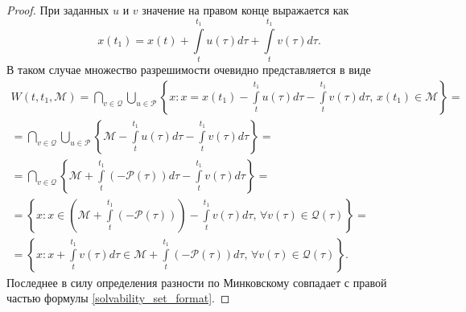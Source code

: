 \begin{proof}
    При заданных \( u \) и \( v \) значение на правом конце выражается как 
    \[
        x(t_1) = x(t) + \int\limits_t^{t_1}u(\tau)d\tau + \int\limits_t^{t_1}
        v(\tau)d\tau.
    \]
    В таком случае множество разрешимости очевидно представляется в виде
    \begin{multline*}
        W(t, t_1, \mathcal{M}) = \bigcap\limits_{v \in \mathcal{Q}} 
         \bigcup\limits_{u \in \mathcal{P}} \left\{ x : x = x(t_1)
         -\int\limits_t^{t_1}u(\tau) d\tau - \int\limits_t^{t_1} v(\tau)
         d\tau, \, x(t_1) \in \mathcal{M} \right\} = \\
        = \bigcap\limits_{v \in \mathcal{Q}} \bigcup\limits_{u \in 
         \mathcal{P}} \left\{ \mathcal{M} - \int\limits_t^{t_1} u(\tau) d\tau
         - \int\limits_t^{t_1} v(\tau) d\tau \right\} = \\
        = \bigcap\limits_{v \in \mathcal{Q}} \left\{ \mathcal{M} +
         \int\limits_t^{t_1}(-\mathcal{P}(\tau)) d\tau - \int\limits_t^{t_1}
         v(\tau) d\tau \right\} = \\
        = \left\{ x : x \in \left( \mathcal{M} + \int\limits_t^{t_1}(- \mathcal{P}
         (\tau)) \right)  - \int\limits_t^{t_1} v(\tau) d\tau, \, \forall v(\tau)
         \in \mathcal{Q}(\tau) \right\} = \\
        = \left\{ x : x + \int\limits_t^{t_1} v(\tau) d\tau \in \mathcal{M} + 
         \int\limits_t^{t_1}(- \mathcal{P}(\tau)) d\tau, \, \forall v(\tau) \in
         \mathcal{Q}(\tau) \right\}.
    \end{multline*}
    Последнее в силу определения разности по Минковскому совпадает с правой частью
     формулы \eqref{solvability_set_format}.
\end{proof}

